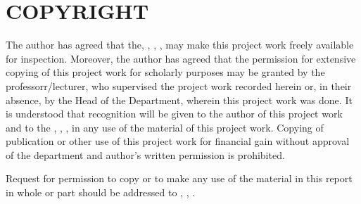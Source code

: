 \chapter*{COPYRIGHT}
\vspace{10pt}

The author has agreed that the, \thedepartment, \thecampus, \theinstitute, may make this project
work freely available for inspection. Moreover, the author has agreed that the
permission for extensive copying of this project work for scholarly purposes may be
granted by the professorr/lecturer, who supervised the project work recorded herein or, in
their absence, by the Head of the Department, wherein this project work was done. It
is understood that recognition will be given to the author of this project work and
to the \thedepartment, \thecampus, \theinstitute, in any use of the material of this project work. Copying of publication or other use of
this project work for financial gain without approval of the department and author’s
written permission is prohibited.

Request for permission to copy or to make any use of the material in this report in
whole or part should be addressed to \thedepartment, \thecampus, \theinstitute.
